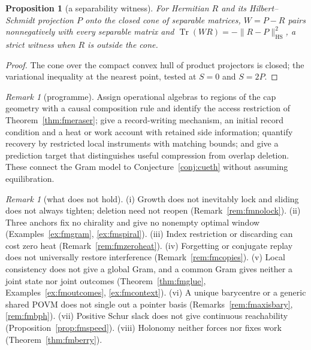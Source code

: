 \documentclass[aps,pra,onecolumn,superscriptaddress,nofootinbib,10pt]{revtex4-2}
\newtheorem{proposition}[theorem]{Proposition}
\theoremstyle{definition}
\theoremstyle{remark}
\newtheorem{remark}[theorem]{Remark}
\newcommand{\tr}{\operatorname{Tr}}
\begin{document}
\begin{proposition}[a separability witness]\label{prop:fmseparable}
For Hermitian $R$ and its Hilbert--Schmidt projection $P$ onto the closed cone of separable matrices, $W=P-R$
pairs nonnegatively with every separable matrix and $\tr(WR)=-\lVert R-P\rVert_{\mathrm{HS}}^2$, a strict witness when $R$ is outside the cone.
\end{proposition}
\begin{proof}
The cone over the compact convex hull of product projectors is closed; the variational inequality at
the nearest point, tested at $S=0$ and $S=2P$.
\end{proof}

\begin{remark}[programme]\label{rem:fmprogramme}
Assign operational algebras to regions of the cap geometry with a causal composition rule and identify
the access restriction of Theorem~\ref{thm:fmeraser}; give a record-writing mechanism, an initial record condition
and a heat or work account with retained side information; quantify recovery by restricted local
instruments with matching bounds; and give a prediction target that distinguishes useful compression
from overlap deletion.  These connect the Gram model to Conjecture~\ref{conj:cueth} without assuming
equilibration.
\end{remark}

\begin{remark}[what does not hold]\label{rem:fmnogo}
(i) Growth does not inevitably lock and sliding does not always tighten; deletion need not reopen
(Remark~\ref{rem:fmnolock}).  (ii) Three anchors fix no chirality and give no nonempty optimal window
(Examples~\ref{ex:fmgram}, \ref{ex:fmspiral}).  (iii) Index restriction or discarding can cost zero heat
(Remark~\ref{rem:fmzeroheat}).  (iv) Forgetting or conjugate replay does not universally restore interference
(Remark~\ref{rem:fmcopies}).  (v) Local consistency does not give a global Gram, and a common Gram gives neither a joint
state nor joint outcomes (Theorem~\ref{thm:fmglue}, Examples~\ref{ex:fmoutcomes}, \ref{ex:fmcontext}).  (vi) A unique barycentre
or a generic shared POVM does not single out a pointer basis (Remarks~\ref{rem:fmaxisbary}, \ref{rem:fmbph}).  (vii) Positive
Schur slack does not give continuous reachability (Proposition~\ref{prop:fmspeed}).  (viii) Holonomy neither forces
nor fixes work (Theorem~\ref{thm:fmberry}).
\end{remark}

\end{document}

